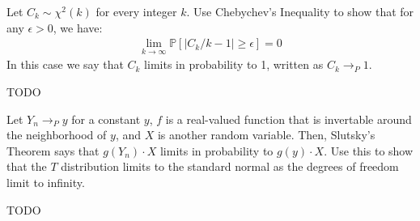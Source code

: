 Let $C_k \sim \chi^2(k)$ for every integer $k$. Use Chebychev's Inequality to show
that for any $\epsilon > 0$, we have:
\begin{align*}
\lim_{k \rightarrow \infty} \mathbb{P} \left[ |C_k/k - 1| \geq \epsilon \right] = 0
\end{align*}
In this case we say that $C_k$ limits in probability to 1, written as
$C_k \rightarrow_P 1$.


TODO


Let $Y_n \rightarrow_P y$ for a constant $y$, $f$ is a real-valued function that
is invertable around the neighborhood of $y$, and $X$ is another random variable.
Then, Slutsky's Theorem says that $g(Y_n) \cdot X$ limits in probability to
$g(y) \cdot X$. Use this to show that the $T$ distribution limits to the standard
normal as the degrees of freedom limit to infinity.


TODO
